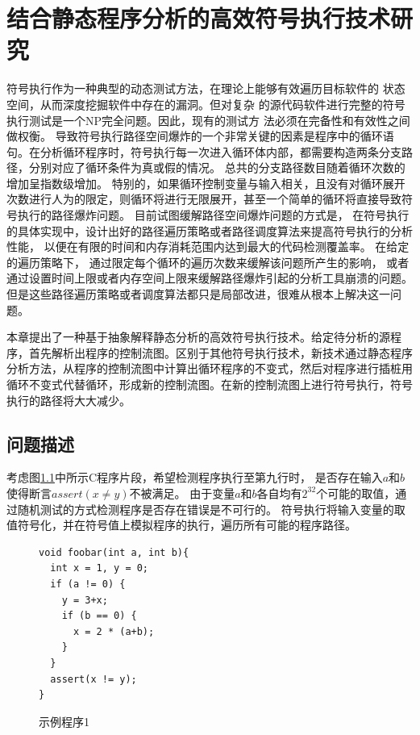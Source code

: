 
\chapter{结合静态程序分析的高效符号执行技术研究}
\label{chap-4}
符号执行作为一种典型的动态测试方法，在理论上能够有效遍历目标软件的
状态空间，从而深度挖掘软件中存在的漏洞。但对复杂
的源代码软件进行完整的符号执行测试是一个NP完全问题。因此，现有的测试方
法必须在完备性和有效性之间做权衡。%
导致符号执行路径空间爆炸的一个非常关键的因素是程序中的循环语句。在分析循环程序时，符号执行每一次进入循环体内部，都需要构造两条分支路径，分别对应了循环条件为真或假的情况。
总共的分支路径数目随着循环次数的增加呈指数级增加。
特别的，如果循环控制变量与输入相关，且没有对循环展开次数进行人为的限定，则循环将进行无限展开，甚至一个简单的循环将直接导致符号执行的路径爆炸问题。
目前试图缓解路径空间爆炸问题的方式是，
在符号执行的具体实现中，设计出好的路径遍历策略或者路径调度算法来提高符号执行的分析性能，
以便在有限的时间和内存消耗范围内达到最大的代码检测覆盖率。
在给定的遍历策略下，
通过限定每个循环的遍历次数来缓解该问题所产生的影响，
或者通过设置时间上限或者内存空间上限来缓解路径爆炸引起的分析工具崩溃的问题。
但是这些路径遍历策略或者调度算法都只是局部改进，很难从根本上解决这一问题。

本章提出了一种基于抽象解释静态分析的高效符号执行技术。给定待分析的源程序，首先解析出程序的控制流图。区别于其他符号执行技术，新技术通过静态程序分析方法，从程序的控制流图中计算出循环程序的不变式，然后对程序进行插桩用循环不变式代替循环，形成新的控制流图。在新的控制流图上进行符号执行，符号执行的路径将大大减少。

\section{问题描述}

考虑图\ref{fig-example1}中所示C程序片段，希望检测程序执行至第九行时，
是否存在输入$a$和$b$使得断言$assert(x \neq y)$不被满足。
由于变量$a$和$b$各自均有$2^{32}$个可能的取值，通过随机测试的方式检测程序是否存在错误是不可行的。
符号执行将输入变量的取值符号化，并在符号值上模拟程序的执行，遍历所有可能的程序路径。

\begin{figure}[h]
\begin{lstlisting}
void foobar(int a, int b){
  int x = 1, y = 0;
  if (a != 0) {
    y = 3+x;
	if (b == 0) {
	  x = 2 * (a+b);
	}
  }
  assert(x != y);
}
\end{lstlisting}
\caption{示例程序1}
\label{fig-example1}
\end{figure}

